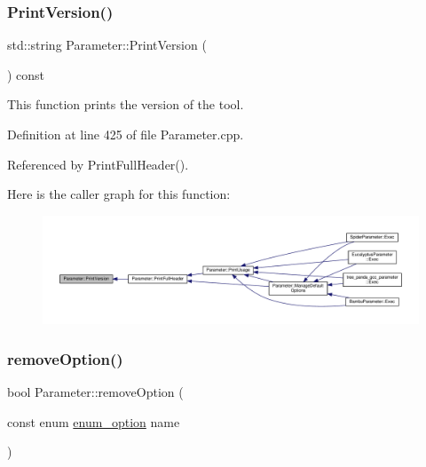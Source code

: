 \subsubsection{\texorpdfstring{Print\+Version()}{PrintVersion()}}
{\footnotesize\ttfamily std\+::string Parameter\+::\+Print\+Version (\begin{DoxyParamCaption}{ }\end{DoxyParamCaption}) const}



This function prints the version of the tool. 



Definition at line 425 of file Parameter.\+cpp.



Referenced by Print\+Full\+Header().

Here is the caller graph for this function\+:
\nopagebreak
\begin{figure}[H]
\begin{center}
\leavevmode
\includegraphics[width=350pt]{dc/dab/classParameter_a061fc14e1db48812ec5a6e7d6e80e1a0_icgraph}
\end{center}
\end{figure}
\mbox{\label{classParameter_a71be9ea891828d800074f3ad02f625d6}} 
\subsubsection{\texorpdfstring{remove\+Option()}{removeOption()}\hspace{0.1cm}{\footnotesize\ttfamily [1/3]}}
{\footnotesize\ttfamily bool Parameter\+::remove\+Option (\begin{DoxyParamCaption}\item[{const enum \hyperlink{Parameter_8hpp_a6d9441db52e537f5588658b218875976}{enum\+\_\+option}}]{name }\end{DoxyParamCaption})\hspace{0.3cm}{\ttfamily [inline]}}



